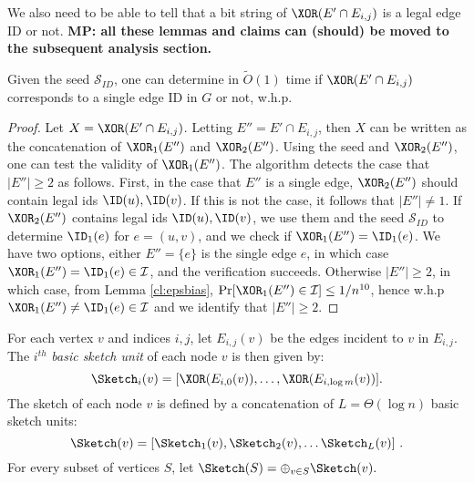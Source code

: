 We also need to be able to tell that a bit string of $\XOR(E' \cap E_{i,j})$ is a legal edge ID or not.
\textbf{MP: all these lemmas and claims can (should) be moved to the subsequent analysis section.}

\begin{lemma}
Given the seed $\mathcal{S}_{ID}$, one can determine in $\widetilde{O}(1)$ time if $\XOR(E' \cap E_{i,j})$ corresponds to a single edge ID in $G$ or not, w.h.p.
\end{lemma}
\begin{proof}
Let $X=\XOR(E' \cap E_{i,j})$. Letting $E''=E' \cap E_{i,j}$, then $X$ can be written as the concatenation of $\XOR_1(E'')$ and $\XOR_2(E'')$. 
Using the seed and $\XOR_2(E'')$, one can test the validity of $\XOR_1(E'')$.
The algorithm detects the case that $|E''| \geq 2$ as follows. First, in the case that $E''$ is a single edge, $\XOR_2(E'')$ should contain legal ids $\ID(u),\ID(v)$. If this is not the case, it follows that $|E''| \neq 1$. If $\XOR_2(E'')$ contains legal ids $\ID(u),\ID(v)$, we use them and the seed $\mathcal{S}_{ID}$ to determine $\ID_1(e)$ for $e = (u,v)$, and we check if $\XOR_1(E'')=\ID_1(e)$. We have two options, either $E'' = \{e\}$ is the single edge $e$, in which case $\XOR_1(E'')=\ID_1(e) \in \mathcal{I}$, and the verification succeeds. Otherwise $|E''| \geq 2$, in which case, from Lemma \ref{cl:epsbias}, $\Pr[\XOR_1(E'') \in \mathcal{I}] \leq 1/n^{10}$, hence w.h.p $\XOR_1(E'') \neq \ID_1(e) \in \mathcal{I}$ and we identify that $|E''| \geq 2$.
\end{proof}
For each vertex $v$ and indices $i,j$, let $E_{i,j}(v)$ be the edges incident to $v$ in $E_{i,j}$. 
The $i^{th}$ \emph{basic sketch unit} of each node $v$ is then given by:
\begin{equation}
\label{eq:vsketch}
\Sketch_i(v)=[\XOR(E_{i,0}(v)),\ldots,\XOR(E_{i,\log m}(v))].
\end{equation}
The sketch of each node $v$ is defined by a concatenation of $L=\Theta(\log n)$ basic sketch units: 
$$\Sketch(v)=[\Sketch_{1}(v),\Sketch_{2}(v), \ldots\Sketch_{L}(v)]~.$$ 
For every subset of vertices $S$, let 
$\Sketch(S)=\oplus_{v \in S}\Sketch(v).$ 

